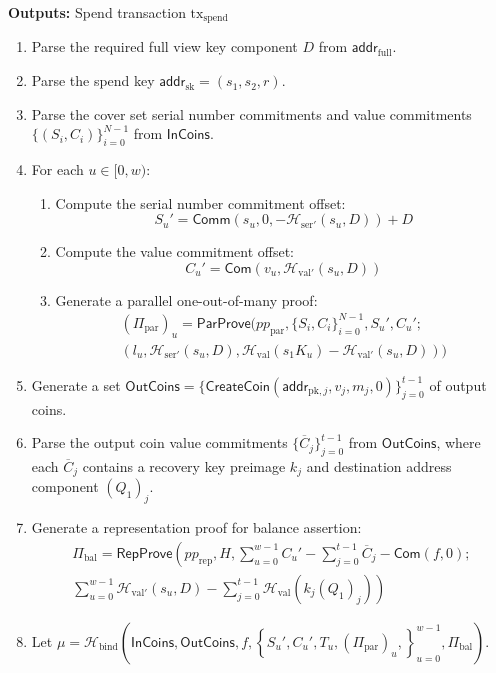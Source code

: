 \documentclass{llncs}
\newcommand{\hash}{\mathcal{H}}
\newcommand{\func}[1]{\mathsf{#1}}
\newcommand{\addr}{\func{addr}}
\newcommand{\com}{\func{Com}}
\newcommand{\comm}{\func{Comm}}
\begin{document}
\textbf{Outputs:} Spend transaction $\text{tx}_{\text{spend}}$

\begin{enumerate}
    \item Parse the required full view key component $D$ from $\addr_{\text{full}}$.
    \item Parse the spend key $\addr_{\text{sk}} = (s_1, s_2, r)$.
    \item Parse the cover set serial number commitments and value commitments $\{(S_i, C_i)\}_{i=0}^{N-1}$ from $\func{InCoins}$.
    \item For each $u \in [0,w)$:
    \begin{enumerate}
        \item Compute the serial number commitment offset: $$S_u' = \comm(s_u, 0, -\hash_{\text{ser}'}(s_u, D)) + D$$
        \item Compute the value commitment offset: $$C_u' = \com(v_u, \hash_{\text{val}'}(s_u, D))$$
        \item Generate a parallel one-out-of-many proof:
        \begin{multline*}
        (\Pi_{\text{par}})_u = \func{ParProve}(pp_{\text{par}},\{S_i, C_i\}_{i=0}^{N-1}, S_u',C_u'; \\
        (l_u, \hash_{\text{ser}'}(s_u, D), \hash_{\text{val}}(s_1 K_u) - \hash_{\text{val}'}(s_u, D)))
        \end{multline*}
    \end{enumerate}
    \item Generate a set $\func{OutCoins} = \{\func{CreateCoin}(\addr_{\text{pk},j}, v_j, m_j, 0)\}_{j=0}^{t-1}$ of output coins.
    \item Parse the output coin value commitments $\{\overline{C}_j\}_{j=0}^{t-1}$ from $\func{OutCoins}$, where each $\overline{C}_j$ contains a recovery key preimage $k_j$ and destination address component $(Q_1)_j$.
    \item Generate a representation proof for balance assertion:
    \begin{multline*}
    \Pi_{\text{bal}} = \func{RepProve}\left( pp_{\text{rep}}, H, \sum_{u=0}^{w-1} C_u' - \sum_{j=0}^{t-1} \overline{C}_j - \com(f,0); \right. \\
    \left. \sum_{u=0}^{w-1} \hash_{\text{val}'}(s_u,D) - \sum_{j=0}^{t-1} \hash_{\text{val}}(k_j(Q_1)_j) \right)
    \end{multline*}
    \item Let $\mu = \hash_{\text{bind}}( \func{InCoins}, \func{OutCoins}, f, \left\{ S_u', C_u', T_u, (\Pi_{\text{par}})_u, \right\}_{u=0}^{w-1}, \Pi_{\text{bal}} )$.

\end{enumerate}
\end{document}
